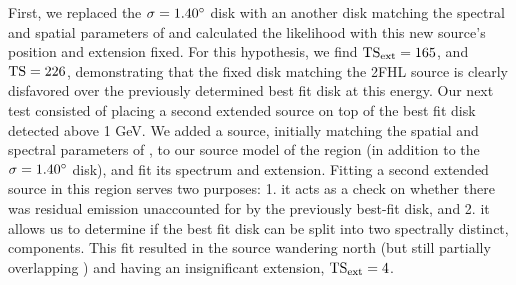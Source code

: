 First, we  replaced the ${\rm \sigma = 1.40^{\circ}}$ disk with an another disk matching the spectral and spatial parameters of \ghard{} and calculated the likelihood with this new source's position and extension fixed. For this hypothesis, we find ${\rm TS_{ext} =  165}$, and  ${\rm TS = 226}$, demonstrating that the fixed disk matching the 2FHL source is clearly disfavored over the previously determined best fit disk at this energy. Our next test consisted of placing a second extended source on top of the best fit disk detected above 1 GeV. We added a source, initially matching the spatial and spectral parameters of \ghard{}, to our source model of the region (in addition to the ${\rm \sigma = 1.40^{\circ}}$ disk), and fit its spectrum and extension. Fitting a second extended source in this region serves two purposes: 1. it acts as a check on whether there was residual emission unaccounted for by the previously best-fit disk, and 2. it allows us to determine if the best fit disk can be split into two spectrally distinct, components. This fit resulted in the source wandering north (but still partially overlapping \Gone{}) and having an insignificant extension, ${\rm TS_{ext} =  4}$.


%


